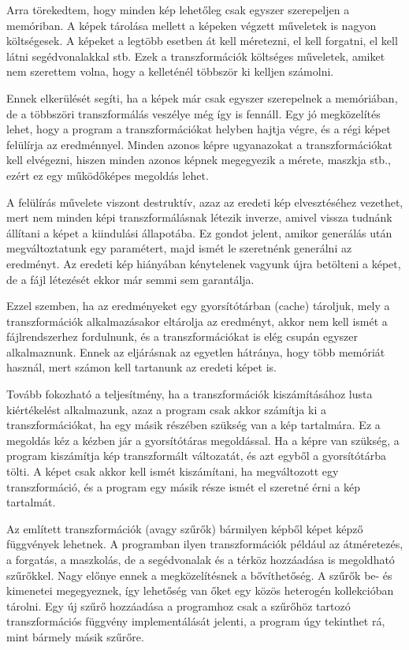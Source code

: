 Arra törekedtem, hogy minden kép lehetőleg csak egyszer szerepeljen a memóriban. A képek tárolása mellett a képeken végzett műveletek is nagyon költségesek. A képeket a legtöbb esetben át kell méretezni, el kell forgatni, el kell látni segédvonalakkal stb. Ezek a transzformációk költséges műveletek, amiket nem szerettem volna, hogy a kelleténél többször ki kelljen számolni.

Ennek elkerülését segíti, ha a képek már csak egyszer szerepelnek a memóriában, de a többszöri transzformálás veszélye még így is fennáll. 
Egy jó megközelítés lehet, hogy a program a transzformációkat helyben hajtja végre, és a régi képet felülírja az eredménnyel. Minden azonos képre ugyanazokat a transzformációkat kell elvégezni, hiszen minden azonos képnek megegyezik a mérete, maszkja stb., ezért ez egy működőképes megoldás lehet.

A felülírás művelete viszont destruktív, azaz az eredeti kép elvesztéséhez vezethet, mert nem minden képi transzformálásnak létezik inverze, amivel vissza tudnánk állítani a képet a kiindulási állapotába.
Ez gondot jelent, amikor generálás után megváltoztatunk egy paramétert, majd ismét le szeretnénk generálni az eredményt. Az eredeti kép hiányában kénytelenek vagyunk újra betölteni a képet, de a fájl létezését ekkor már semmi sem garantálja.

Ezzel szemben, ha az eredményeket egy gyorsítótárban (cache) tároljuk, mely a transzformációk alkalmazásakor eltárolja az eredményt, akkor nem kell ismét a fájlrendszerhez fordulnunk, és a transzformációkat is elég csupán egyszer alkalmaznunk. Ennek az eljárásnak az egyetlen hátránya, hogy több memóriát használ, mert számon kell tartanunk az eredeti képet is.

Tovább fokozható a teljesítmény, ha a transzformációk kiszámításához lusta kiértékelést alkalmazunk, azaz a program csak akkor számítja ki a transzformációkat, ha egy másik részében szükség van a kép tartalmára. 
Ez a megoldás kéz a kézben jár a gyorsítótáras megoldással. Ha a képre van szükség, a program kiszámítja kép transzformált változatát, és azt egyből a gyorsítótárba tölti. A képet csak akkor kell ismét kiszámítani, ha megváltozott egy transzformáció, és a program egy másik része ismét el szeretné érni a kép tartalmát.

Az említett transzformációk (avagy szűrők) bármilyen képből képet képző függvények lehetnek. A programban ilyen transzformációk például az átméretezés, a forgatás, a maszkolás, de a segédvonalak és a térköz hozzáadása is megoldható szűrőkkel. 
Nagy előnye ennek a megközelítésnek a bővíthetőség. A szűrők be- és kimenetei megegyeznek, így lehetőség van őket egy közös heterogén kollekcióban tárolni. Egy új szűrő hozzáadása a programhoz csak a szűrőhöz tartozó transzformációs függvény implementálását jelenti, a program úgy tekinthet rá, mint bármely másik szűrőre.

